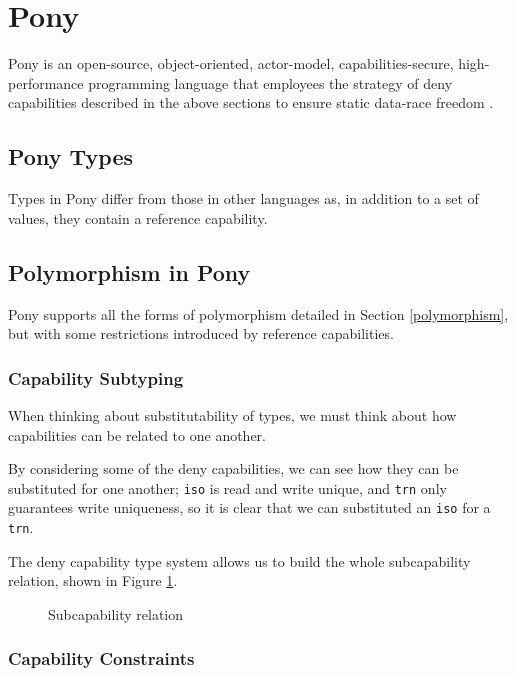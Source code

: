 \section{Pony}

Pony is an open-source, object-oriented, actor-model, capabilities-secure, high-performance programming language that employees the strategy of deny capabilities described in the above sections to ensure static data-race freedom \cite{PonyWeb}.

\subsection{Pony Types}

Types in Pony differ from those in other languages as, in addition to a set of values, they contain a reference capability.

\subsection{Polymorphism in Pony}

Pony supports all the forms of polymorphism detailed in Section \ref{polymorphism}, but with some restrictions introduced by reference capabilities.

\subsubsection{Capability Subtyping}

When thinking about substitutability of types, we must think about how capabilities can be related to one another.

By considering some of the deny capabilities, we can see how they can be substituted for one another; \texttt{iso} is read and write unique, and \texttt{trn} only guarantees write uniqueness, so it is clear that we can substituted an \texttt{iso} for a \texttt{trn}. 

The deny capability type system \cite{Clebsch2015} allows us to build the whole subcapability relation, shown in Figure \ref{fig:subcap}.

\begin{figure}[h]
    \centering
    
    \caption{Subcapability relation}
    \label{fig:subcap}
\end{figure}

\subsubsection{Capability Constraints}

